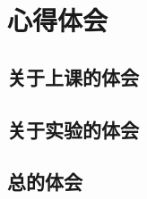 \documentclass[12pt]{article}
\begin{document}
\newpage
\section{\centering 心得体会}

\subsection{关于上课的体会}

\subsection{关于实验的体会}

\subsection{总的体会}
\end{document}
